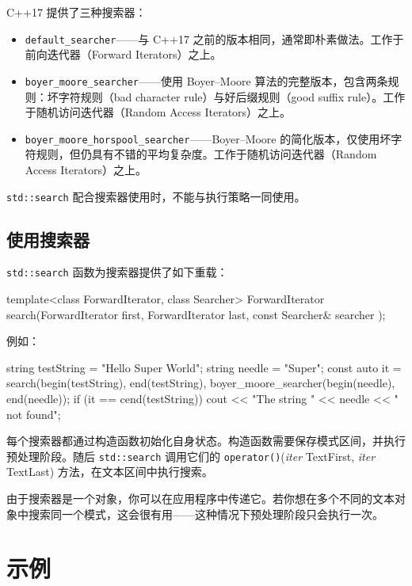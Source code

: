 C++17 提供了三种搜索器：

\begin{itemize}
\item \texttt{default\_searcher}——与 C++17 之前的版本相同，通常即朴素做法。工作于前向迭代器（Forward Iterators）之上。
\item \texttt{boyer\_moore\_searcher}——使用 Boyer–Moore 算法的完整版本，包含两条规则：坏字符规则（bad character rule）与好后缀规则（good suffix rule）。工作于随机访问迭代器（Random Access Iterators）之上。
\item \texttt{boyer\_moore\_horspool\_searcher}——Boyer–Moore 的简化版本，仅使用坏字符规则，但仍具有不错的平均复杂度。工作于随机访问迭代器（Random Access Iterators）之上。
\end{itemize}

\texttt{std::search} 配合搜索器使用时，不能与执行策略一同使用。

\subsection{使用搜索器}

\texttt{std::search} 函数为搜索器提供了如下重载：

\begin{codebox}[cpp]
template<class ForwardIterator, class Searcher>
ForwardIterator search(ForwardIterator first, ForwardIterator last,
const Searcher& searcher );
\end{codebox}

例如：

\begin{codebox}[cpp]
string testString = "Hello Super World";
string needle = "Super";
const auto it = search(begin(testString), end(testString),
boyer_moore_searcher(begin(needle), end(needle));
if (it == cend(testString))
cout << "The string " << needle << " not found\n";
\end{codebox}

每个搜索器都通过构造函数初始化自身状态。构造函数需要保存模式区间，并执行预处理阶段。随后 \texttt{std::search} 调用它们的 \texttt{operator()}(\textit{iter} TextFirst, \textit{iter} TextLast) 方法，在文本区间中执行搜索。

由于搜索器是一个对象，你可以在应用程序中传递它。若你想在多个不同的文本对象中搜索同一个模式，这会很有用——这种情况下预处理阶段只会执行一次。

\section{示例}

